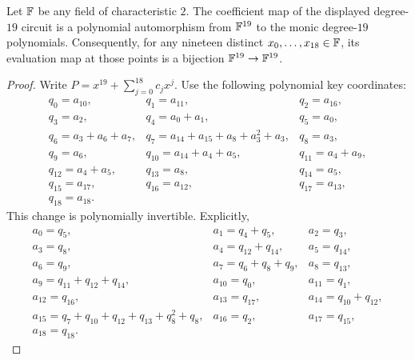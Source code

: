 \begin{lemma}
\label{lem:char2-degree19-inverse}
Let $\mathbb{F}$ be any field of characteristic $2$.  The coefficient map of
the displayed degree-$19$ circuit is a polynomial automorphism from $\mathbb{F}^{19}$
to the monic degree-$19$ polynomials.  Consequently, for any nineteen
distinct $x_0,\ldots,x_{18}\in\mathbb{F}$, its evaluation map at those points is a
bijection $\mathbb{F}^{19}\to\mathbb{F}^{19}$.
\end{lemma}
\begin{proof}
Write $P=x^{19}+\sum_{j=0}^{18}c_jx^j$.  Use the following polynomial key
coordinates:
\[
\begin{array}{lll}
q_0=a_{10},&q_1=a_{11},&q_2=a_{16},\\
q_3=a_2,&q_4=a_0+a_1,&q_5=a_0,\\
q_6=a_3+a_6+a_7,
 &q_7=a_{14}+a_{15}+a_8+a_3^2+a_3,&q_8=a_3,\\
q_9=a_6,&q_{10}=a_{14}+a_4+a_5,&q_{11}=a_4+a_9,\\
q_{12}=a_4+a_5,&q_{13}=a_8,&q_{14}=a_5,\\
q_{15}=a_{17},&q_{16}=a_{12},&q_{17}=a_{13},\\
q_{18}=a_{18}.&&
\end{array}                                                       \tag{A.15}\label{eq:char2-19-q-forward}
\]
This change is polynomially invertible.  Explicitly,
\[
\begin{array}{lll}
a_0=q_5,&a_1=q_4+q_5,&a_2=q_3,\\
a_3=q_8,&a_4=q_{12}+q_{14},&a_5=q_{14},\\
a_6=q_9,&a_7=q_6+q_8+q_9,&a_8=q_{13},\\
a_9=q_{11}+q_{12}+q_{14},&a_{10}=q_0,&a_{11}=q_1,\\
a_{12}=q_{16},&a_{13}=q_{17},&a_{14}=q_{10}+q_{12},\\
a_{15}=q_7+q_{10}+q_{12}+q_{13}+q_8^2+q_8,
 &a_{16}=q_2,&a_{17}=q_{15},\\
a_{18}=q_{18}.&&
\end{array}                                                       \tag{A.16}\label{eq:char2-19-q-inverse}
\]


\end{proof}
